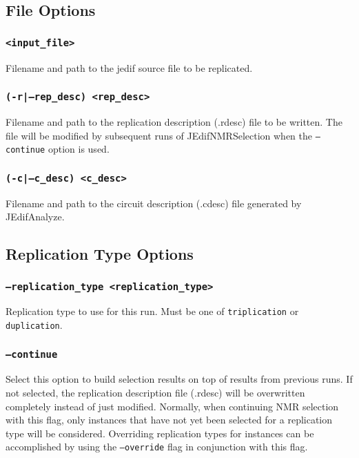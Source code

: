 \subsection{File Options}

\subsubsection{\texttt{<input\_file>}}
Filename and path to the jedif source file to be replicated.

\subsubsection{\texttt{(-r|--rep\_desc) <rep\_desc>}}
Filename and path to the replication description (.rdesc) file to be written.
The file will be modified by subsequent runs of JEdifNMRSelection when the
\texttt{--continue} option is used.

\subsubsection{\texttt{(-c|--c\_desc) <c\_desc>}}
Filename and path to the circuit description (.cdesc) file generated by
JEdifAnalyze.

\subsection{Replication Type Options}

\subsubsection{\texttt{--replication\_type <replication\_type>}}
Replication type to use for this run. Must be one of \texttt{triplication} or
\texttt{duplication}.

\subsubsection{\texttt{--continue}}
Select this option to build selection results on top of results from previous
runs. If not selected, the replication description file (.rdesc) will be
overwritten completely instead of just modified. Normally, when continuing NMR
selection with this flag, only instances that have not yet been selected for a
replication type will be considered. Overriding replication types for instances
can be accomplished by using the \texttt{--override} flag in conjunction with
this flag.

